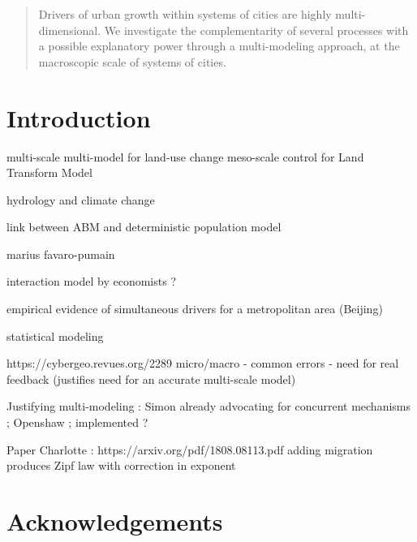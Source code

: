 \documentclass[alpha-refs]{wiley-article}
\begin{document}
\begin{abstract}
Drivers of urban growth within systems of cities are highly multi-dimensional. We investigate the complementarity of several processes with a possible explanatory power through a multi-modeling approach, at the macroscopic scale of systems of cities.

\end{abstract}




\section{Introduction}




\cite{verburg2008multi} multi-scale multi-model for land-use change
\cite{tayyebi2013hierarchical} meso-scale control for Land Transform Model %

\cite{wiley2010multi} hydrology and climate change


\cite{2018arXiv180404913C} link between ABM and deterministic population model

\cite{cottineau2015modular} marius 
\cite{favaro2011gibrat} favaro-pumain

\cite{hsieh2015housing} interaction model by economists ?


\cite{li2013forty} empirical evidence of simultaneous drivers for a metropolitan area (Beijing)

\cite{nong2011urban} statistical modeling



https://cybergeo.revues.org/2289 micro/macro - common errors - need for real feedback (justifies need for an accurate multi-scale model)



Justifying multi-modeling : Simon already advocating for concurrent mechanisms \cite{simon1968judging} ; Openshaw \cite{openshaw1983data} ; \cite{turton1997genetic} implemented ?

Paper Charlotte : https://arxiv.org/pdf/1808.08113.pdf adding migration produces Zipf law with correction in exponent



\section*{Acknowledgements}
\end{document}
